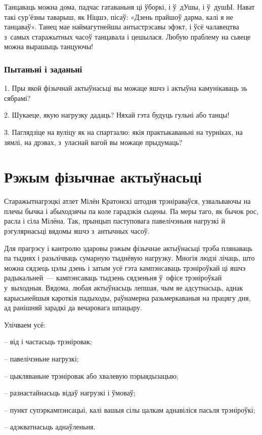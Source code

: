 Танцаваць можна дома, падчас гатаваньня ці ўборкі, і ў~дУшы, і ў~душЫ. Нават такі сур'ёзны таварыш, як Ніцшэ, пісаў: «Дзень прайшоў дарма, калі я не танцаваў». Танец мае наймагутнейшы антыстрэсавы эфэкт, і ўсё чалавецтва з~самых старажытных часоў танцавала і цешылася. Любую праблему на сьвеце можна вырашыць танцуючы!

\subsubsection{Пытаньні і заданьні}

1. Пры якой фізычнай актыўнасьці вы можаце яшчэ і актыўна камунікаваць зь сябрамі?

2. Шукаеце, якую нагрузку дадаць? Няхай гэта будуць гульні або танцы!

3. Паглядзіце на вуліцу як на спартзалю: якія практыкаваньні на турніках, на зямлі, на дрэвах, з~уласнай вагой вы можаце прыдумаць?


\section{Рэжым фізычнае актыўнасьці}

Старажытнагрэцкі атлет Мілён Кратонскі штодня трэніраваўся, узвальваючы на плечы бычка і абыходзячы па коле гарадзкія сьцены. Па меры таго, як бычок рос, расла і сіла Мілёна. Так, прынцып паступовага павелічэньня нагрузкі й рэгулярнасьці вядомы яшчэ з~антычных часоў.

Для прагрэсу і кантролю здаровы рэжым фізычнае актыўнасьці трэба плянаваць па тыднях і разьлічваць сумарную тыднёвую нагрузку. Многія людзі лічаць, што можна сядзець цэлы дзень і затым усё гэта кампэнсаваць трэніроўкай ці яшчэ радыкальней~--- кампэнсаваць тыдзень сядзеньня ў~офісе трэніроўкай у~выходныя. Вядома, любая актыўнасьць лепшая, чым яе адсутнасьць, аднак карысьнейшыя кароткія падыходы, раўнамерна разьмеркаваныя на працягу дня, ад ранішняй зарадкі да вечаровага шпацыру.

Улічваем усё: 

– від і частасьць трэніровак; 

– павелічэньне нагрузкі; 

– цыкляваньне трэніровак або хвалевую пэрыядызацыю; 

– разнастайнасьць відаў нагрузкі і ўмоваў; 

– пункт супэркампэнсацыі, калі вашыя сілы цалкам аднавіліся пасьля трэніроўкі;

– адэкватнасьць аднаўленьня.

